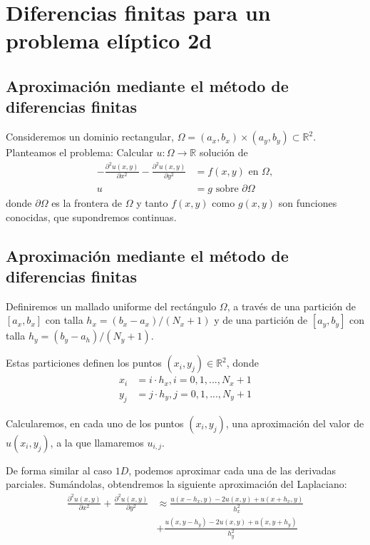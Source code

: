 \documentclass[11pt,spanish,a4wide]{article}
\def\Rset{\mathbb{R}}
\newcommand{\en}{\mbox{\ en \ }}
\newcommand{\sobre}{\mbox{\ sobre \ }}
\begin{document}
\section{Diferencias finitas para un problema elíptico  2d}

\label{sec:MEF-difusion-2d}

\subsection{Aproximación mediante el método de diferencias finitas}

Consideremos un dominio rectangular, $\Omega=(a_x,b_x)\times(a_y,b_y)
\subset \Rset^2$.
Planteamos el problema: Calcular $u:\Omega \to  \Rset$ solución de
\begin{align}
  \label{pb1d}
  -\frac{\partial^2 u(x,y) }{\partial x^2}
  -\frac{\partial^2 u(x,y) }{\partial y^2}
  &= f(x,y) \en \Omega, \\
  u&=g \sobre \partial\Omega
\end{align}
donde $\partial\Omega$ es la frontera de $\Omega$ y tanto $f(x,y)$
como $g(x,y)$ son funciones conocidas, que supondremos continuas.


\subsection{Aproximación mediante el método de diferencias finitas}

Definiremos un mallado uniforme del rectángulo $\Omega$, a través de
una partición de $[a_x,b_x]$ con talla $h_x = (b_x-a_x)/(N_x+1)$ y de
una partición de $[a_y,b_y]$ con talla $h_y = (b_y-a_h)/(N_y+1)$.

Estas particiones definen los puntos $(x_i,y_j)\in\Rset^2$, donde
\begin{align*}
  x_i &= i\cdot h_x, i=0,1,...,N_x+1
  \\
  y_j &= j\cdot h_y, j=0,1,...,N_y+1
\end{align*}

Calcularemos, en cada uno de los puntos $(x_i,y_j)$, una aproximación del
valor de $u(x_i,y_j)$, a la que llamaremos $u_{i,j}$.

De forma similar al caso $1D$, podemos aproximar cada una de las
derivadas parciales. Sumándolas, obtendremos la siguiente aproximación
del Laplaciano:
\begin{align*}
  \frac{\partial^2 u(x,y) }{\partial x^2}
  +
  \frac{\partial^2 u(x,y)}{\partial y^2}
  & \approx \frac{u(x-h_x,y)-2u(x,y)+u(x+h_x,y)}{h_x^2}
  \\
  &+
  \frac{u(x,y-h_y)-2u(x,y)+u(x,y+h_y)}{h_y^2}
\end{align*}
\end{document}
